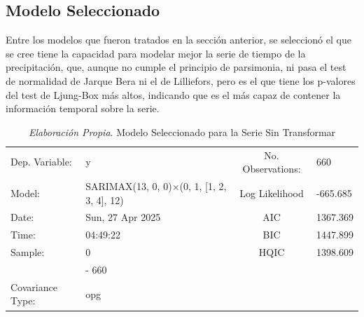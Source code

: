 \documentclass[12pt,letterpaper]{article}   %
\begin{document}
\subsection{Modelo Seleccionado}
Entre los modelos que fueron tratados en la sección anterior, se seleccionó el que se cree tiene la capacidad para modelar mejor la serie de tiempo de la precipitación, que, aunque no cumple el principio de parsimonia, ni pasa el test de normalidad de Jarque Bera ni el de Lilliefors, pero es el que tiene los p-valores del test de Ljung-Box más altos, indicando que es el más capaz de contener la información temporal sobre la serie.
\begin{table}[htbp]
\centering
\tiny
\caption{\textit{Elaboración Propia}. Modelo Seleccionado para la Serie Sin Transformar}
\begin{tabular}{llcl}
\toprule
Dep. Variable: & y & No. Observations: & 660 \\
Model: & SARIMAX(13, 0, 0)$\times$(0, 1, [1, 2, 3, 4], 12) & Log Likelihood & -665.685 \\
Date: & Sun, 27 Apr 2025 & AIC & 1367.369 \\
Time: & 04:49:22 & BIC & 1447.899 \\
Sample: & 0 & HQIC & 1398.609 \\
        & - 660 & & \\
Covariance Type: & opg & & \\
\bottomrule
\end{tabular}

\vspace{0.3cm}



\end{table}
\end{document}
